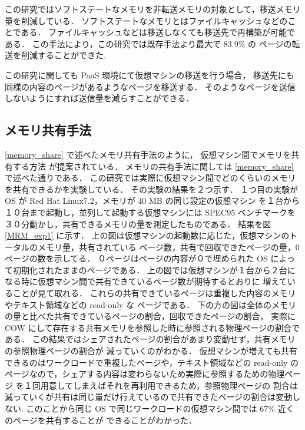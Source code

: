 \documentclass[graduation-thesis]{mlarticle}
\begin{document}
この研究ではソフトステートなメモリを非転送メモリの対象として，移送メモリ量を削減している．
ソフトステートなメモリとはファイルキャッシュなどのことである．
ファイルキャッシュなどは移送しなくても移送先で再構築が可能である．
この手法により，この研究では既存手法より最大で 83.9\% の
ページの転送を削減することができた.

この研究に関しても PaaS 環境にて仮想マシンの移送を行う場合，
移送先にも同様の内容のページがあるようなページを移送する．
そのようなページを送信しないようにすれば送信量を減らすことができる．

\subsection{メモリ共有手法}
\label{sec-3-3}
\ref{memory_share} で述べたメモリ共有手法のように，
仮想マシン間でメモリを共有する方法 \cite{Waldspurger:2002:MRM} が提案されている．
メモリの共有手法に関しては \ref{memory_share} で述べた通りである．
この研究では実際に仮想マシン間でどのくらいのメモリを共有できるかを実験している．
その実験の結果を２つ示す．
１つ目の実験が OS が Red Hat Linux7.2，メモリが 40 MB の同じ設定の仮想マシン
を１台から１０台まで起動し，並列して起動する仮想マシンには SPEC95 ベンチマークを
３０分動かし，共有できるメモリの量を測定したものである．
結果を図 \ref{MRM_exp1} に示す．
上の図は仮想マシンの起動数に応じた，仮想マシンのトータルのメモリ量，共有されている
ページ数，共有で回収できたページの量，0ページの数を示してる．
０ページはページの内容が０で埋められた OS によって初期化されたままのページである．
上の図では仮想マシンが１台から２台になる時に仮想マシン間で共有できているページ数が期待するとおりに
増えていることが見て取れる．
これらの共有できているページは重複した内容のメモリやテキスト領域などの read-only な
ページである．
下の方の図は全体のメモリの量と比べた共有できているページの割合，回収できたページの割合，
実際に COW にして存在する共有メモリを参照した時に参照される物理ページの割合である．
この結果ではシェアされたページの割合があまり変動せず，共有メモリの参照物理ページの割合が
減っていくのがわかる．
仮想マシンが増えても共有できるのはワークロードで重複したページや，テキスト領域などの
read-only のページなので，シェアする内容は変わらないため実際に参照するための物理ページ
を１回用意してしまえばそれを再利用できるため，参照物理ページの
割合は減っていくが共有は同じ量だけ行えているので共有できたページの割合は変動しない.
このことから同じ OS で同じワークロードの仮想マシン間では 67\% 近くのページを共有することが
できることがわかった．
\end{document}

